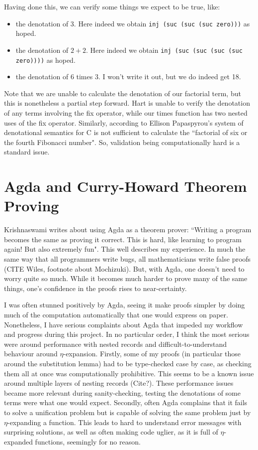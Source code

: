 \documentclass[12pt,a4paper,twoside,openright]{report}
\begin{document}
Having done this, we can verify some things we expect to be true, like:
\begin{itemize}
\item the denotation of 3. Here indeed we obtain \texttt{inj (suc (suc (suc zero)))} as hoped.
\item the denotation of $2+2$. Here indeed we obtain \texttt{inj (suc (suc (suc (suc zero))))} as hoped.
\item the denotation of $6$ times $3$. I won't write it out, but we do indeed get 18.
\end{itemize}
Note that we are unable to calculate the denotation of our factorial term, but this is nonetheless a partial step forward. Hart \cite{Hart} is unable to verify the denotation of any terms involving the fix operator, while our times function has two nested uses of the fix operator. Similarly, according to Ellison \cite{C-DenSem2} Papaspyrou's system of denotational semantics for C \cite{C-DenSem} is not sufficient to calculate the ``factorial of six or the fourth Fibonacci number". So, validation being computationally hard is a standard issue. 
\section{Agda and Curry-Howard Theorem Proving}
Krishnaswami \cite{Types} writes about using Agda as a theorem prover: ``Writing a program becomes the same as proving it correct. This is hard, like learning to program again! But also extremely fun". This well describes my experience. In much the same way that all programmers write bugs, all mathematicians write false proofs (CITE Wiles, footnote about Mochizuki). But, with Agda, one doesn't need to worry quite so much. While it becomes much harder to prove many of the same things, one's confidence in the proofs rises to near-certainty. 

I was often stunned positively by Agda, seeing it make proofs simpler by doing much of the computation automatically that one would express on paper. Nonetheless, I have serious complaints about Agda that impeded my workflow and progress during this project. In no particular order, I think the most serious were around performance with nested records and difficult-to-understand behaviour around $\eta$-expansion. Firstly, some of my proofs (in particular those around the substitution lemma) had to be type-checked case by case, as checking them all at once was computationally prohibitive. This seems to be a known issue around multiple layers of nesting records (Cite?). These performance issues became more relevant during sanity-checking, testing the denotations of some terms were what one would expect. Secondly, often Agda complains that it fails to solve a unification problem but is capable of solving the same problem just by $\eta$-expanding a function. This leads to hard to understand error messages with surprising solutions, as well as often making code uglier, as it is full of $\eta$-expanded functions, seemingly for no reason. 
\end{document}
